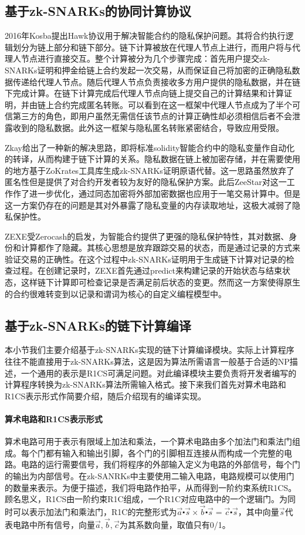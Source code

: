 \subsection{基于zk-SNARKs的协同计算协议}
2016年Kosba提出Hawk\cite{7546538}协议用于解决智能合约的隐私保护问题。其将合约执行逻辑划分为链上部分和链下部分。链下计算被放在代理人节点上进行，而用户将与代理人节点进行直接交互。整个计算被分为几个步骤完成：首先用户提交zk-SNARKs证明和押金给链上合约发起一次交易，从而保证自己将加密的正确隐私数据传递给代理人节点。随后代理人节点负责接收多方用户提供的隐私数据，并在链下完成计算。在链下计算完成后代理人节点向链上提交自己的计算结果和计算证明，并由链上合约完成匿名转账。可以看到在这一框架中代理人节点成为了半个可信第三方的角色，即用户虽然无需信任该节点的计算正确性却必须相信后者不会泄露收到的隐私数据。此外这一框架与隐私匿名转账紧密结合，导致应用受限。

Zkay\cite{2020arXiv200901020B}给出了一种新的解决思路，即将标准solidity智能合约中的隐私变量作自动化的转译，从而构建于链下计算的关系。隐私数据在链上被加密存储，并在需要使用的地方基于ZoKrates\cite{8726497}工具库生成zk-SNARKs证明原语代替。这一思路虽然放弃了匿名性但是提供了对合约开发者较为友好的隐私保护方案。此后ZeeStar\cite{9833732}对这一工作作了进一步优化，通过同态加密将外部加密数据也应用于一笔交易计算中。但是这一方案仍存在的问题是其对外暴露了隐私变量的内存读取地址，这极大减弱了隐私保护性。

ZEXE\cite{9152634}受Zerocash\cite{6956581}的启发，为智能合约提供了更强的隐私保护特性，其对数据、身份和计算都作了隐藏。其核心思想是放弃跟踪交易的状态，而是通过记录的方式来验证交易的正确性。在这个过程中zk-SNARKs证明用于生成链下计算对记录的检查过程。在创建记录时，ZEXE首先通过predict来构建记录的开始状态与结束状态，这样链下计算即可检查记录是否满足前后状态的变更。然而这一方案使得原生的合约很难转变到以记录和谓词为核心的自定义编程模型中。
\subsection{基于zk-SNARKs的链下计算编译}
本小节我们主要介绍基于zk-SNARKs实现的链下计算编译模块。实际上计算程序往往不能直接用于zk-SNARKs算法，这是因为算法所需语言一般基于合适的NP描述，一个通用的表示是R1CS可满足问题\cite{10.1007/978-3-030-56877-1_25}。对此编译模块主要负责将开发者编写的计算程序转换为zk-SNARKs算法所需输入格式。接下来我们首先对算术电路和R1CS表示形式作简要介绍，随后介绍现有的编译实现。

\paragraph{算术电路和R1CS表示形式} 算术电路可用于表示有限域上加法和乘法，一个算术电路由多个加法门和乘法门组成。每个门都有输入和输出引脚，各个门的引脚相互连接从而构成一个完整的电路。电路的运行需要信号，我们将程序的外部输入定义为电路的外部信号，每个门的输出为内部信号。在zk-SANRKs中主要使用二输入电路，电路规模可以使用门的数量来表示。为便于描述，我们将电路作拍平，从而得到一阶约束系统R1CS。顾名思义，R1CS由一阶约束R1C组成，一个R1C对应电路中的一个逻辑门。为同时可以表示加法门和乘法门，R1C的完整形式为$\vec{a} \centerdot \vec{s} \times \vec{b} \centerdot \vec{s} = \vec{c} \centerdot \vec{s}$，其中向量$\vec{s}$代表电路中所有信号，向量$\vec{a}, \vec{b}, \vec{c}$为其系数向量，取值只有0/1。


